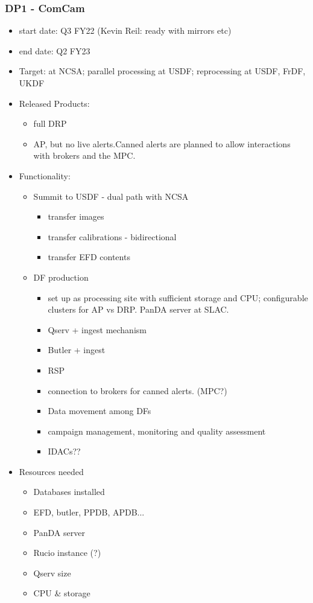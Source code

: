\subsubsection{ \gls{DP1} - ComCam}
\begin{itemize}
\item start date: Q3 \gls{FY22} (Kevin Reil: ready with mirrors etc)
\item end date: Q2 \gls{FY23}
\item Target: at \gls{NCSA}; parallel processing at USDF; reprocessing at USDF, FrDF, UKDF
\item Released Products:
\begin{itemize}
\item full \gls{DRP}
\item \gls{AP}, but no live alerts.Canned alerts are planned to allow
  interactions with brokers and the \gls{MPC}.
\end{itemize}
\item Functionality:
\begin{itemize}
\item \gls{Summit} to \gls{USDF}  - dual path with NCSA
\begin{itemize}
\item transfer images
\item transfer calibrations - bidirectional
\item transfer \gls{EFD} contents
\end{itemize}
\item \gls{DF} production
\begin{itemize}
\item set up as processing site with sufficient storage and \gls{CPU};
  configurable clusters for AP vs DRP. PanDA server at \gls{SLAC}.
\item \gls{Qserv} + ingest mechanism
\item \gls{Butler} + ingest
\item \gls{RSP}
\item connection to brokers for canned alerts. (\gls{MPC}?)
\item Data movement among DFs
\item campaign management, \gls{monitoring} and quality assessment
\item IDACs??
\end{itemize}
\end{itemize}
\item Resources needed
\begin{itemize}
\item Databases installed
\item \gls{EFD}, butler, \gls{PPDB}, APDB...
\item \gls{PanDA} server
\item \gls{Rucio} instance (?)
\item \gls{Qserv} size
\item \gls{CPU} \& storage
\end{itemize}
\end{itemize}
